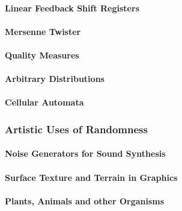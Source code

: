 \paragraph{Linear Feedback Shift Registers}

\paragraph{Mersenne Twister}

\paragraph{Quality Measures}



\paragraph{Arbitrary Distributions}



\paragraph{Cellular Automata}




\subsubsection{Artistic Uses of Randomness}

\paragraph{Noise Generators for Sound Synthesis}

\paragraph{Surface Texture and Terrain in Graphics}

\paragraph{Plants, Animals and other Organisms}




